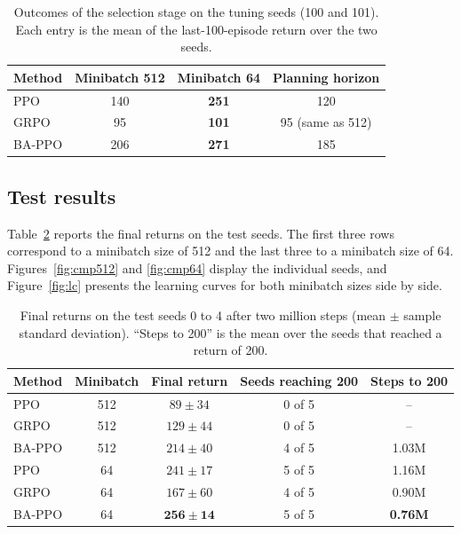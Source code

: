 \documentclass[11pt,a4paper]{article}
\begin{document}
\begin{table}[t]
\centering
\caption{Outcomes of the selection stage on the tuning seeds (100 and 101). Each entry is the mean of the last-100-episode return over the two seeds.}
\label{tab:tuning}
\begin{tabular}{@{}lccc@{}}
\toprule
Method & Minibatch 512 & Minibatch 64 & Planning horizon \\
\midrule
PPO & 140 & \textbf{251} & 120 \\
GRPO & 95 & \textbf{101} & 95 (same as 512) \\
BA-PPO & 206 & \textbf{271} & 185 \\
\bottomrule
\end{tabular}
\end{table}

\subsection{Test results}
\label{sec:test}

Table~\ref{tab:main} reports the final returns on the test seeds. The first three rows correspond to a minibatch size of 512 and the last three to a minibatch size of 64. Figures~\ref{fig:cmp512} and \ref{fig:cmp64} display the individual seeds, and Figure~\ref{fig:lc} presents the learning curves for both minibatch sizes side by side.

\begin{table}[t]
\centering
\caption{Final returns on the test seeds 0 to 4 after two million steps (mean $\pm$ sample standard deviation). ``Steps to 200'' is the mean over the seeds that reached a return of 200.}
\label{tab:main}
\begin{tabular}{@{}lcccc@{}}
\toprule
Method & Minibatch & Final return & Seeds reaching 200 & Steps to 200 \\
\midrule
PPO & 512 & $89 \pm 34$ & 0 of 5 & -- \\
GRPO & 512 & $129 \pm 44$ & 0 of 5 & -- \\
BA-PPO & 512 & $214 \pm 40$ & 4 of 5 & 1.03M \\
\midrule
PPO & 64 & $241 \pm 17$ & 5 of 5 & 1.16M \\
GRPO & 64 & $167 \pm 60$ & 4 of 5 & 0.90M \\
BA-PPO & 64 & $\mathbf{256 \pm 14}$ & 5 of 5 & \textbf{0.76M} \\
\bottomrule
\end{tabular}
\end{table}
\end{document}
